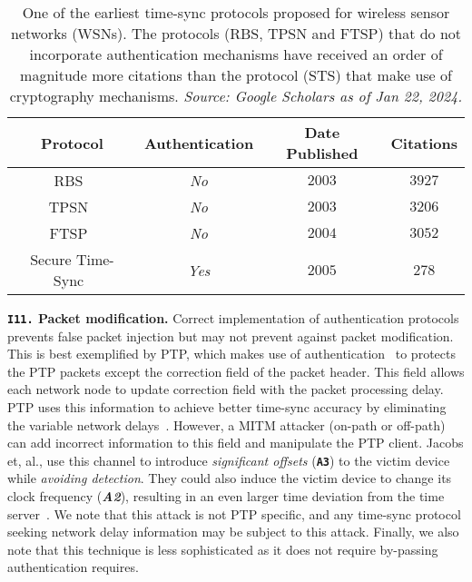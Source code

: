 \begin{table}
\scriptsize
\centering
\begin{tabular}{ | c | c | c | c | }
 \hline
  \textbf{Protocol} & \textbf{Authentication} & \textbf{Date Published} & \textbf{Citations} \\
 \hline
 \hline
  RBS~\cite{Elson2003RBS}  & \textit{No} & $2003$ & $3927$   \\
 \hline
   TPSN~\cite{tpsn-2003}  & \textit{No} & $2003$ & $3206$   \\
 \hline
   FTSP~\cite{ftsp-2004}  & \textit{No} & $2004$ & $3052$   \\
 \hline
 \hline
   Secure Time-Sync~\cite{Elson2003RBS}  & \textit{Yes} & $2005$ & $278$   \\
 \hline
\end{tabular}
\caption{One of the earliest time-sync protocols proposed for wireless sensor networks (WSNs). The protocols (RBS, TPSN and FTSP) that do not incorporate authentication mechanisms have received an order of magnitude more citations than the protocol (STS) that make use of cryptography mechanisms. \textit{Source: Google Scholars as of Jan 22, 2024.}}
\label{tab:time-sync-wsn-citations}
\end{table}

\noindent\textbf{\texttt{I11.} Packet modification.} Correct implementation of authentication protocols prevents false packet injection but may not prevent against packet modification. This is best exemplified by PTP, which makes use of authentication~\cite{ptp-std-doc} to protects the PTP packets except the correction field of the packet header. This field allows each network node to update correction field with the packet processing delay. PTP uses this information to achieve better time-sync accuracy by eliminating the variable network delays~\cite{net-sync-ptp-covert-channel}. However, a MITM attacker (on-path or off-path) can add incorrect information to this field and manipulate the PTP client. Jacobs et, al., use this channel to introduce \textit{significant offsets} (\textbf{\texttt{A3}}) to the victim device while \textit{avoiding detection}. They could also induce the victim device to change its clock frequency (\textbf{\textit{A2}}), resulting in an even larger time deviation from the time server~\cite{net-sync-ptp-covert-channel}. We note that this attack is not PTP specific, and any time-sync protocol seeking network delay information may be subject to this attack. Finally, we also note that this technique is less sophisticated as it does not require by-passing authentication requires.


